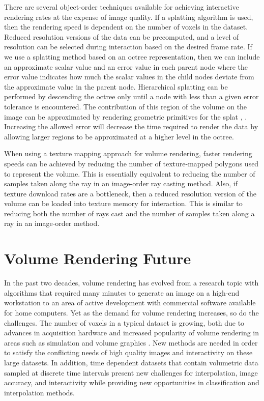 There are several object-order techniques available for achieving interactive rendering rates at the expense of image quality. If a splatting algorithm is used, then the rendering speed is dependent on the number of voxels in the dataset. Reduced resolution versions of the data can be precomputed, and a level of resolution can be selected during interaction based on the desired frame rate. If we use a splatting method based on an octree representation, then we can include an approximate scalar value and an error value in each parent node where the error value indicates how much the scalar values in the child nodes deviate from the approximate value in the parent node. Hierarchical splatting \cite{Laur91} can be performed by descending the octree only until a node with less than a given error tolerance is encountered. The contribution of this region of the volume on the image can be approximated by rendering geometric primitives for the splat \cite{Shirley90}, \cite{Wilhelms91}. Increasing the allowed error will decrease the time required to render the data by allowing larger regions to be approximated at a higher level in the octree.

When using a texture mapping approach for volume rendering, faster rendering speeds can be achieved by reducing the number of texture-mapped polygons used to represent the volume. This is essentially equivalent to reducing the number of samples taken along the ray in an image-order ray casting method. Also, if texture download rates are a bottleneck, then a reduced resolution version of the volume can be loaded into texture memory for interaction. This is similar to reducing both the number of rays cast and the number of samples taken along a ray in an image-order method.

\section{Volume Rendering Future}

In the past two decades, volume rendering has evolved from a research topic with algorithms that required many minutes to generate an image on a high-end workstation to an area of active development with commercial software available for home computers. Yet as the demand for volume rendering increases, so do the challenges. The number of voxels in a typical dataset is growing, both due to advances in acquisition hardware and increased popularity of volume rendering in areas such as simulation and volume graphics \cite{Kaufman93}. New methods are needed in order to satisfy the conflicting needs of high quality images and interactivity on these large datasets. In addition, time dependent datasets that contain volumetric data sampled at discrete time intervals present new challenges for interpolation, image accuracy, and interactivity while providing new opportunities in classification and interpolation methods.

